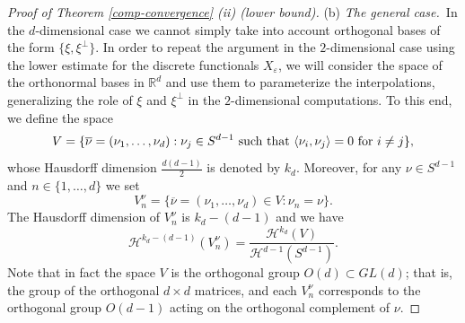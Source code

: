 \documentclass[11pt]{article}
\def\e{\varepsilon}
\begin{document}
\begin{proof}[Proof of Theorem {\rm\ref{comp-convergence}} {\rm (ii)} (lower bound)]
\smallskip 

\noindent(b) {\em The general case.}\ 
In the $d$-dimensional case we cannot simply take into account orthogonal bases of the form $\{\xi, \xi^\perp\}$. 
In order to repeat the argument in the $2$-dimensional case using the lower estimate for the discrete functionals $X_\e$, we will consider the space of the orthonormal bases in $\mathbb R^d$ 
and use them to parameterize the interpolations, generalizing the role of $\xi$ and $\xi^\perp$ in the $2$-dimensional computations.  
To this end, we define the space
$$V=\{\overline \nu=(\nu_1,\dots, \nu_d): \nu_j\in S^{d-1}  \ \hbox{\rm such that }  \langle \nu_i, \nu_j\rangle=0 \ \hbox{\rm for } i\neq j\},$$ 
whose Hausdorff dimension $\frac{d(d-1)}{2}$ is denoted by $k_d$. 
Moreover, for any $\nu\in S^{d-1}$ and $n\in \{1,\dots, d\}$ we set 
$$V^{\nu}_n=\{\overline \nu=(\nu_1,\dots, \nu_d)\in V: \nu_n=\nu\}.$$ 
The Hausdorff dimension of $V^{\nu}_n$ is $k_d-(d-1)$ and we have 
\begin{equation}\label{dim} 
\mathcal H^{k_d-(d-1)}(V^{\nu}_n)=\frac{\mathcal H^{k_d}(V)}{\mathcal H^{d-1}(S^{d-1})}.
\end{equation} 
Note that in fact the space $V$ is the orthogonal group $O(d)\subset GL(d)$; that is, the group of the orthogonal $d\times d$ matrices, and each $V^{\nu}_n$ corresponds to the orthogonal group $O(d-1)$ acting on the orthogonal complement of $\nu$. 


\end{proof}
\end{document}

